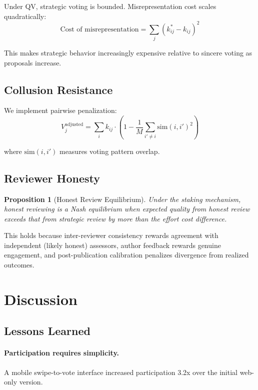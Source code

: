 \documentclass[11pt,a4paper]{article}
\newtheorem{proposition}{Proposition}
\begin{document}
Under QV, strategic voting is bounded. Misrepresentation cost scales
quadratically:
\begin{equation}
  \text{Cost of misrepresentation} = \sum_j (k_{ij}^* - k_{ij})^2
\end{equation}

This makes strategic behavior increasingly expensive relative to sincere
voting as proposals increase.

\subsection{Collusion Resistance}

We implement pairwise penalization:
\begin{equation}
  V_j^{\text{adjusted}} = \sum_i k_{ij} \cdot \left(1 -
  \frac{1}{M} \sum_{i' \neq i} \text{sim}(i, i')^2\right)
\end{equation}

where $\text{sim}(i, i')$ measures voting pattern overlap.

\subsection{Reviewer Honesty}

\begin{proposition}[Honest Review Equilibrium]
Under the staking mechanism, honest reviewing is a Nash equilibrium when
expected quality from honest review exceeds that from strategic review
by more than the effort cost difference.
\end{proposition}

This holds because inter-reviewer consistency rewards agreement with
independent (likely honest) assessors, author feedback rewards genuine
engagement, and post-publication calibration penalizes divergence from
realized outcomes.


\section{Discussion}
\label{sec:discussion}

\subsection{Lessons Learned}

\paragraph{Participation requires simplicity.} A mobile swipe-to-vote
interface increased participation 3.2x over the initial web-only version.
\end{document}
